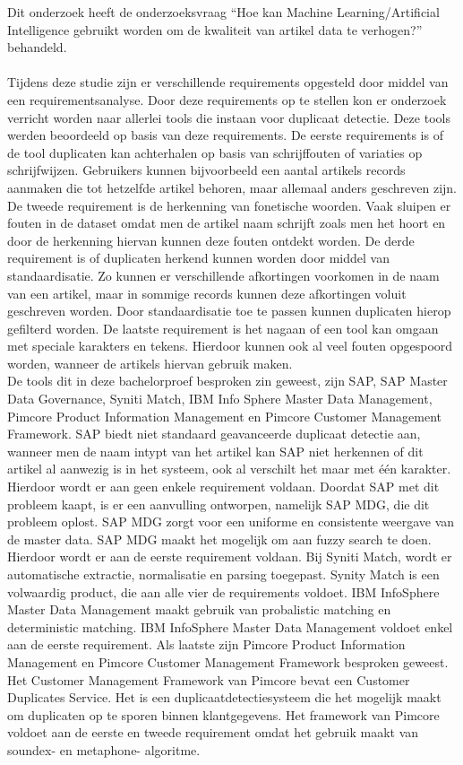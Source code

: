 Dit onderzoek heeft de onderzoeksvraag “Hoe kan Machine Learning/Artificial Intelligence gebruikt worden om de kwaliteit van artikel data te verhogen?” behandeld. 
\\ \\Tijdens deze studie zijn er verschillende requirements opgesteld door middel van een requirementsanalyse. Door deze requirements op te stellen kon er onderzoek verricht worden naar allerlei tools die instaan voor duplicaat detectie. Deze tools werden beoordeeld op basis van deze requirements. De eerste requirements is of de tool duplicaten kan achterhalen op basis van schrijffouten of variaties op schrijfwijzen. Gebruikers kunnen bijvoorbeeld een aantal artikels records aanmaken die tot hetzelfde artikel behoren, maar allemaal anders geschreven zijn. De tweede requirement is de herkenning van fonetische woorden. Vaak sluipen er fouten in de dataset omdat men de artikel naam schrijft zoals men het hoort en door de herkenning hiervan kunnen deze fouten ontdekt worden. De derde requirement is of duplicaten herkend kunnen worden door middel van standaardisatie. Zo kunnen er verschillende afkortingen voorkomen in de naam van een artikel, maar in sommige records kunnen deze afkortingen voluit geschreven worden. Door standaardisatie toe te passen kunnen duplicaten hierop gefilterd worden. De laatste requirement is het nagaan of een tool kan omgaan met speciale karakters en tekens. Hierdoor kunnen ook al veel fouten opgespoord worden, wanneer de artikels hiervan gebruik maken.
\\De tools dit in deze bachelorproef besproken zin geweest, zijn SAP, SAP Master Data Governance, Syniti Match, IBM Info Sphere Master Data Management, Pimcore Product Information Management en Pimcore Customer Management Framework.  SAP biedt niet standaard geavanceerde duplicaat detectie aan, wanneer men de naam intypt van het artikel kan SAP niet herkennen of dit artikel al aanwezig is in het systeem, ook al verschilt het maar met één karakter. Hierdoor wordt er aan geen enkele requirement voldaan. Doordat SAP met dit probleem kaapt, is er een aanvulling ontworpen, namelijk SAP MDG, die dit probleem oplost. SAP MDG zorgt voor een uniforme en consistente weergave van de master data. SAP MDG maakt het mogelijk om aan fuzzy search te doen.  Hierdoor wordt er aan de eerste requirement voldaan. Bij Syniti Match, wordt er automatische extractie, normalisatie en parsing toegepast. Synity Match is een volwaardig product, die aan alle vier de requirements voldoet. IBM InfoSphere Master Data Management maakt gebruik van probalistic matching en deterministic matching.  IBM InfoSphere Master Data Management voldoet enkel aan de eerste requirement. Als laatste zijn Pimcore Product Information Management en Pimcore Customer Management Framework besproken geweest. Het Customer Management Framework van Pimcore bevat een Customer Duplicates Service. Het is een duplicaatdetectiesysteem die het mogelijk maakt om duplicaten op te sporen binnen klantgegevens. Het framework van Pimcore voldoet aan de eerste en tweede requirement omdat het gebruik maakt van soundex- en metaphone- algoritme.

